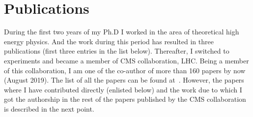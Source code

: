 \chapter {Publications}
During the first two years of my Ph.D I worked in the area of theoretical high energy physics. And the work during this period has resulted in three publications (first three entries in the list below). Thereafter, I switched to experiments and became a member of CMS collaboration, LHC. Being a member of this collaboration, I am one of the co-author of more than 160 papers by now (August 2019). The list of all the papers can be found at~\cite{rvermaPub}. However, the papers where I have contributed directly 
(enlisted below) and the work due to which I got the authorship in the rest of the papers published 
by the CMS collaboration is described in the next point.

